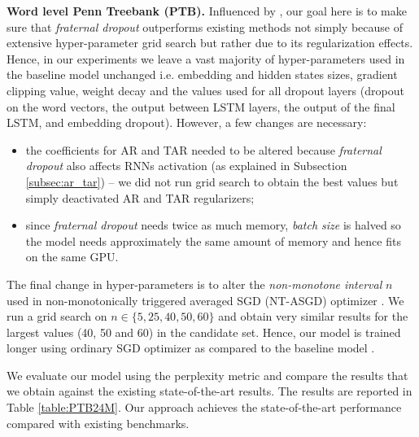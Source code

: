 \documentclass{article} %
\begin{document}
\textbf{Word level Penn Treebank (PTB).} Influenced by \cite{melis2017state}, our goal here is to make sure that \emph{fraternal dropout} outperforms existing methods not simply because of extensive hyper-parameter grid search but rather due to its regularization effects. Hence, in our experiments we leave a vast majority of hyper-parameters used in the baseline model \citep{melis2017state} unchanged i.e. embedding and hidden states sizes, gradient clipping value, weight decay and the values used for all dropout layers (dropout on the word vectors, the output between LSTM layers, the output of the final LSTM, and embedding dropout). However, a few changes are necessary:
\begin{itemize}
\item the coefficients for AR and TAR needed to be altered because \emph{fraternal dropout} also affects RNNs activation (as explained in Subsection \ref{subsec:ar_tar}) -- we did not run grid search to obtain the best values but simply deactivated AR and TAR regularizers;
\item since \emph{fraternal dropout} needs twice as much memory, \textit{batch size} is halved so the model needs approximately the same amount of memory and hence fits on the same GPU.
\end{itemize}
The final change in hyper-parameters is to alter the \emph{non-monotone interval} $n$ used in non-monotonically triggered averaged SGD (NT-ASGD) optimizer \cite{polyak1992acceleration, mandt2017stochastic,melis2017state}. We run a grid search on $n \in \{5, 25, 40, 50, 60\}$ and obtain very similar results for the largest values (40, 50 and 60) in the candidate set. Hence, our model is trained longer using ordinary SGD optimizer as compared to the baseline model \citep{melis2017state}.

We evaluate our model using the perplexity metric and compare the results that we obtain against the existing state-of-the-art results. The results are reported in Table \ref{table:PTB24M}. Our approach achieves the state-of-the-art performance compared with existing benchmarks.
\end{document}
